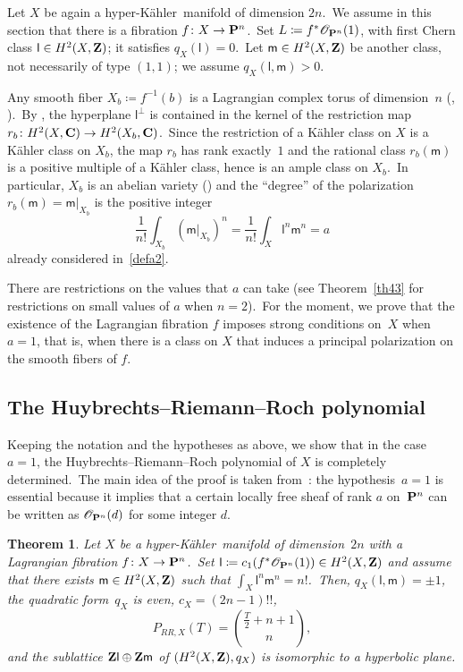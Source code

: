 \documentclass[12pt]{amsart}
\def\cO{\mathscr{O}}
\def\Z{{\bf Z}}
\def\C{{\bf C}}
\def\P{{\bf P}}
\def\hk{hyper-K\"ahler}
\newtheorem{theo}[lemm]{Theorem}
\theoremstyle{remark}
\def\lll{\ensuremath{\mathsf l}}
\def\mm{\ensuremath{\mathsf m}}
\begin{document}
Let $X$ be again a \hk\ manifold of dimension $2n$.\
We assume in this section that there is a  fibration $f\colon X\to \P^n$.\
Set $L\coloneqq f^*\cO_{\P^n}(1)$, with first Chern class $\lll\in H^2(X,\Z)$; it satisfies \mbox{$q_X(\lll)=0$.}\
Let $\mm\in H^2(X,\Z)$ be another class, not necessarily of type $(1,1)$; we assume \mbox{$q_X(  \lll, \mm)>0$.}

Any smooth fiber $X_b\coloneqq f^{-1}(b)$ is a Lagrangian complex torus  of dimension~$n$ (\cite[Theorem~1]{mat}, \cite[Theorem 1]{ac}).\
By \cite[Lemma~2.2]{matlag}, the hyperplane $\lll^\bot$ is contained in the kernel of the  restriction map $r_b\colon H^2(X,\C)\to H^2(X_b,\C)$.\
Since the restriction of a K\"ahler class on $X$ is a K\"ahler class on $X_b$, the map $r_b$ has rank exactly~$1$ and the rational class $r_b(\mm)$ is  a positive multiple of a K\"ahler class, hence is an ample class on $X_b$.\
In particular, $X_b$ is an abelian variety (\cite[Proposition~4]{ac}) and the ``degree'' of the polarization $r_b(\mm)=\mm\vert_{X_b}$ is the positive integer
\begin{equation*}
  \frac{1}{n!}\int_{X_b}(\mm\vert_{X_b})^{n}= \frac{1}{n!}\int_X \lll^{n}\mm^{n}=a
\end{equation*}
already considered in~\eqref{defa2}.



There are restrictions on the values that $a$ can take (see Theorem~\ref{th43}   for restrictions on small values of $a$ when $n=2$).\
For the moment, we prove that the existence of the Lagrangian fibration $f$ imposes strong conditions on~$X$ when~$a=1$, that is, when there is a class on $X$ that induces a principal polarization on the smooth fibers of $f$.

\subsection{The Huybrechts--Riemann--Roch polynomial}\label{subsec:RRpolynomialLagrangian}

Keeping the notation and the hypotheses as above, we show that in the case $a=1$, the Huybrechts--Riemann--Roch polynomial of $X$ is completely determined.\
The main idea of the proof is taken from~\cite{ort}: the hypothesis~$a=1$ is essential because it implies that a certain locally free sheaf of rank $a$ on~$\P^n$ can be written as $\cO_{\P^n}(d)$ for some integer $d$.

\begin{theo}\label{th21}
Let $X$ be a \hk\ manifold of dimension~$2n$ with a Lagrangian fibration $f\colon X\to \P^n$.\
Set $\lll\coloneqq c_1(f^*\cO_{\P^n}(1))\in H^2(X,\Z)$ and assume that there exists $\mm\in H^2(X,\Z)$ such that $\int_X \lll^{n}\mm^{n}=n!$.\
Then, $q_X(\lll,\mm)=\pm 1$, the quadratic form~$q_X$ is even, $c_X=(2n-1)!!$,
\begin{equation*}
P_{RR,X}(T)= \binom{\frac{T}{2}+n+1}{n},
\end{equation*}
and the sublattice $\Z\lll\oplus \Z\mm$ of $(H^2(X,\Z),q_X)$ is isomorphic to a hyperbolic plane.
\end{theo}
\end{document}
